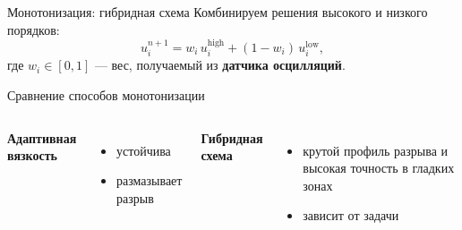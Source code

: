 \documentclass[12pt, aspectratio=169]{beamer}
\begin{document}
\begin{frame}{Монотонизация: гибридная схема}
Комбинируем решения высокого и низкого порядков:
\[
u^{n+1}_i = w_i\, u^{\text{high}}_i + (1-w_i)\, u^{\text{low}}_i,
\]
где $w_i\in[0,1]$ — вес, получаемый из \textbf{датчика осцилляций}.


\begin{center}
\scalebox{0.75}{}
\end{center}
\end{frame}


\begin{frame}{Сравнение способов монотонизации}
  
\vspace{0.1cm}
\begin{columns}
    \textbf{Адаптивная вязкость}
    \begin{itemize}
    \vspace{-0.2cm}
    \item[$+$] устойчива
    \vspace{-0.2cm}
    \item[$-$] размазывает разрыв
    \end{itemize}
\vspace{0.2cm}
    \textbf{Гибридная схема}
    \begin{itemize}
    \vspace{-0.2cm}
    \item[$+$] крутой профиль разрыва и высокая точность в гладких зонах
    \vspace{-0.2cm}
    \item[$-$] зависит от задачи
    \end{itemize}
\end{columns}

\begin{center}
\scalebox{0.75}{}
\end{center}
\end{frame}
\end{document}
